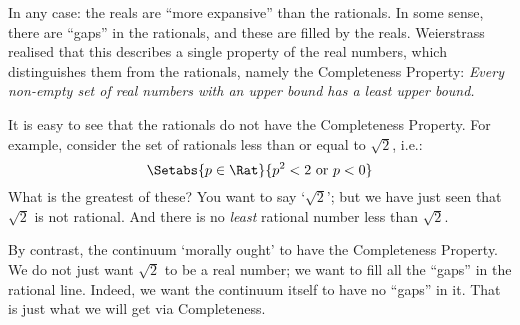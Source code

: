 \documentclass[../../../include/open-logic-section]{subfiles}
\begin{document}
In any case: the reals are ``more expansive'' than the rationals. In some sense, there are ``gaps'' in the rationals, and these are filled by the reals. Weierstrass realised that this describes a single property of the real numbers, which distinguishes them from the rationals, namely the Completeness Property: \emph{Every non-empty set of real numbers with an upper bound has a least upper bound.} 

It is easy to see that the rationals do not have the Completeness Property. For example, consider the set of rationals less than or equal to $\sqrt{2}$, i.e.:
\[
	\Setabs{p \in \Rat}{p^2 < 2 \text{ or }p < 0}
\]
What is the greatest of these? You want to say `$\sqrt{2}$'; but we have just seen that $\sqrt{2}$ is not rational. And there is no \emph{least} rational number less than $\sqrt{2}$. 

By contrast, the continuum `morally ought' to have the Completeness Property. We do not just want $\sqrt{2}$ to be a real number; we want to fill all the ``gaps'' in the rational line. Indeed, we want the continuum itself to have no ``gaps'' in it. That is just what we will get via Completeness.
\end{document}
